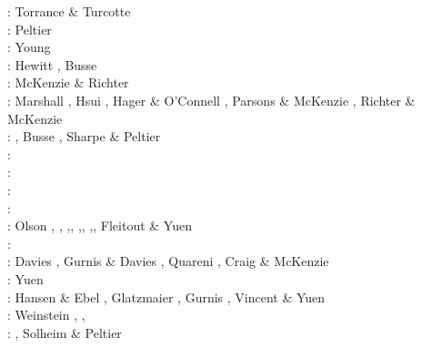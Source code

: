\begin{scriptsize}
\nineteenseventyone: Torrance \& Turcotte \cite{totu71}\\
\nineteenseventytwo: Peltier \cite{pelt72}\\
\nineteenseventyfour: Young \cite{youn74}\\
\nineteenseventyfive: Hewitt \etal \cite{hemw75}, Busse \cite{buss75}\\
\nineteenseventysix: McKenzie \& Richter \cite{mcri76}\\
\nineteenseventyeight: Marshall \etal \cite{mahz78}, Hsui \cite{hsui78}, Hager \& O'Connell \cite{haoc78},
                       Parsons \& McKenzie \cite{pamc78}, Richter \& McKenzie \cite{rimc78}\\
\nineteenseventynine: \cite{ludt79}, Busse \cite{buss79}, Sharpe \& Peltier \cite{shpe79}\\
\nineteeneighty: \cite{olco80}\cite{jamc80}\cite{scsc80}\cite{zess80}\\
\nineteeneightyone: \cite{buss81}\cite{jasc81}\cite{haoc81}\cite{cotu81}\\
\nineteeneightytwo: \cite{jape82}\cite{homc82}\cite{buri82}\\
\nineteeneightythree: \cite{hous83}\cite{hous83b}
                      \cite{chri83}\cite{mcke83}
                      \cite{chri83b}\cite{zesd83}\\
\nineteeneightyfour: Olson \etal \cite{olyb84}, \cite{jarv84},
                     \cite{haeb84},\cite{harp84},
                     \cite{davi84},\cite{boas84},
                     \cite{chri84},\cite{moca84},
                     Fleitout \& Yuen \cite{flyu84,flyu84b}\\
\nineteeneightyfive: \cite{jarv85}\cite{baum85}\cite{chri85}\cite{csra85}\cite{scan85}\\
\nineteeneightysix: Davies \cite{davi86}, Gurnis \& Davies \cite{guda86},
                    Quareni \etal \cite{quys86}, Craig \& McKenzie \cite{crmc86}\\
\nineteeneightyseven: Yuen \etal{}\cite{yuqh87}\\
\nineteeneightyeight: Hansen \& Ebel \cite{haeb88}, Glatzmaier \cite{glat88}, 
                      Gurnis \cite{gurn88}, Vincent \& Yuen \cite{viyu88} \\ 
\nineteeneightynine: Weinstein \etal \cite{weoy89}, \cite{besg89}\cite{schm89}\cite{sthe89},\cite{rivi89}\\
\nineteenninety: \cite{trab90}\cite{gurn90}\cite{ketu90}, Solheim \& Peltier \cite{sope90}\\

\end{scriptsize}
